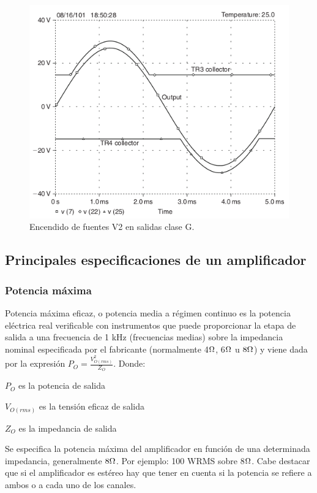 \begin{figure}[H]
 \centering
 \includegraphics[scale=0.35]{img/ampliG_salida.png}
 \caption{Encendido de fuentes V2 en salidas clase G.}
 \label{ampliG_salida} 
 \end{figure}

\subsection{Principales especificaciones de un amplificador}

\subsubsection{Potencia máxima}

Potencia máxima eficaz, o potencia media a régimen continuo es la potencia eléctrica real verificable con instrumentos que puede proporcionar la etapa de salida  a una frecuencia de 1 kHz (frecuencias medias) sobre la impedancia nominal especificada por el fabricante (normalmente 4$\ohm$, 6$\ohm$ u $8\ohm$) y viene dada por la expresión $P_O=  \frac{V_{O(rms)}^2}{Z_O}$. Donde:
\begin{description}
\item $P_O$ es la potencia de salida
\item $V_{O(rms)}$ es la tensión eficaz de salida
\item $Z_O$ es la impedancia de salida
\end{description}

Se especifica la potencia máxima del amplificador en función de una determinada impedancia, generalmente $8\ohm$. Por ejemplo: 100 WRMS sobre 8$\ohm$.
Cabe destacar que si el amplificador es estéreo hay que tener en cuenta si la potencia se refiere a      ambos o a cada uno de los canales.

